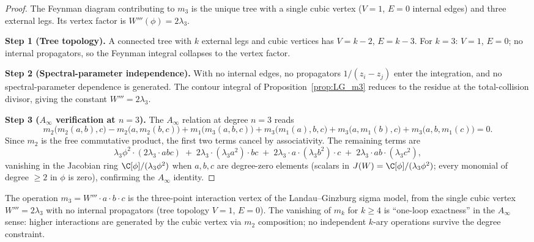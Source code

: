 \begin{proof}
The Feynman diagram contributing to $m_3$ is the unique tree with a single cubic vertex ($V=1$, $E=0$ internal edges) and three external legs. Its vertex factor is $W'''(\phi)=2\lambda_3$.

\textbf{Step 1 (Tree topology).}
A connected tree with $k$ external legs and cubic vertices has $V = k-2$, $E = k-3$. For $k=3$: $V=1$, $E=0$; no internal propagators, so the Feynman integral collapses to the vertex factor.

\textbf{Step 2 (Spectral-parameter independence).}
With no internal edges, no propagators $1/(z_i - z_j)$ enter the integration, and no spectral-parameter dependence is generated. The contour integral of Proposition~\ref{prop:LG_m3} reduces to the residue at the total-collision divisor, giving the constant $W'''=2\lambda_3$.

\textbf{Step 3 ($A_\infty$ verification at $n=3$).}
The $A_\infty$ relation at degree $n=3$ reads
\begin{equation}\label{eq:lg-ainfty-n3}
 m_2\bigl(m_2(a,b),c\bigr) - m_2\bigl(a,m_2(b,c)\bigr)
 + m_1\bigl(m_3(a,b,c)\bigr)
 + m_3\bigl(m_1(a),b,c\bigr) + m_3\bigl(a,m_1(b),c\bigr)
 + m_3\bigl(a,b,m_1(c)\bigr) = 0.
\end{equation}
Since $m_2$ is the free commutative product, the first two terms cancel by associativity. The remaining terms are
\begin{equation}\label{eq:lg-ainfty-check}
 \lambda_3\phi^2 \cdot (2\lambda_3 \cdot abc)
 \;+\; 2\lambda_3 \cdot (\lambda_3 a^2) \cdot bc
 \;+\; 2\lambda_3 \cdot a \cdot (\lambda_3 b^2) \cdot c
 \;+\; 2\lambda_3 \cdot ab \cdot (\lambda_3 c^2),
\end{equation}
vanishing in the Jacobian ring $\C[\phi]/(\lambda_3\phi^2)$ when $a,b,c$ are degree-zero elements (scalars in $J(W) = \C[\phi]/(\lambda_3\phi^2)$; every monomial of degree $\ge 2$ in $\phi$ is zero), confirming the $A_\infty$ identity.
\end{proof}

\begin{remark}
\label{rem:lg-m3-physics}
The operation $m_3 = W''' \cdot a \cdot b \cdot c$ is the three-point interaction vertex of the Landau--Ginzburg sigma model, from the single cubic vertex $W'''=2\lambda_3$ with no internal propagators (tree topology $V=1$, $E=0$). The vanishing of $m_k$ for $k \ge 4$ is ``one-loop exactness'' in the $A_\infty$ sense: higher interactions are generated by the cubic vertex via $m_2$ composition; no independent $k$-ary operations survive the degree constraint.
\end{remark}


